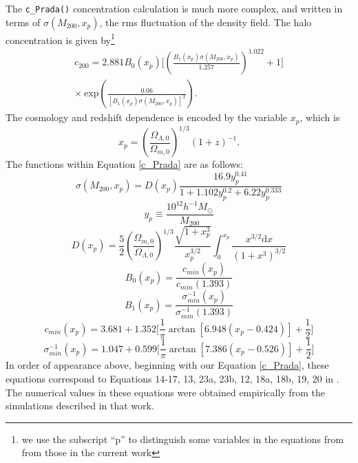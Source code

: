 \documentclass[twocolumn]{aastex6}
\newcommand{\code}{\lstinline[style=codeintext]}
\begin{document}
The \code{c_Prada()} concentration calculation is much more complex, and written in terms of $\sigma(M_{200}, x_p)$, the rms fluctuation of the density field. The \citet{Prada12} halo concentration is given by\footnote{we use the subscript ``p'' to distinguish some variables in the equations from \citet{Prada12} from those in the current work}
\begin{equation}\label{c_Prada}
\begin{split}
c_{200} = 2.881 B_0 (x_p) \bigg[ \left( \frac{B_1(x_p) \sigma(M_{200},x_p)}{1.257} \right)^{1.022} + 1 \bigg] \\
\times\ \mathrm{exp}\left( \frac{0.06}{[B_1(x_p) \sigma(M_{200},x_p) ]^2} \right).
\end{split}
\end{equation}
The cosmology and redshift dependence is encoded by the variable $x_p$, which is
\begin{equation}
x_p = \left( \frac{\Omega_{\Lambda, 0}}{\Omega_{m, 0}} \right)^{1/3} (1 + z)^{-1}.
\end{equation}
The functions within Equation \ref{c_Prada} are as follows:
\begin{equation}
\sigma(M_{200},x_p) = D(x_p) \frac{16.9 y_p^{0.41}}{1 + 1.102 y_p^{0.2} + 6.22 y_p^{0.333}}
\end{equation}
\begin{equation}
y_p \equiv \frac{10^{12} h^{-1} M_\odot}{M_{200}}
\end{equation}
\begin{equation}
D(x_p) = \frac{5}{2} \left( \frac{\Omega_{m, 0}}{\Omega_{\Lambda, 0}} \right)^{1/3} \frac{\sqrt{1 + x_p^3}}{x_p^{3/2}} \int_0^{x_p} \frac{x^{3/2} \mathrm{d}x}{(1 + x^3)^{3/2}}
\end{equation}
\begin{equation}
B_0(x_p) = \frac{c_{min}(x_p)}{c_{min}(1.393)}
\end{equation}
\begin{equation}
B_1(x_p) = \frac{\sigma^{-1}_{min}(x_p)}{\sigma^{-1}_{min}(1.393)}
\end{equation}
\begin{equation}
c_{min}(x_p) = 3.681 + 1.352 \bigg[ \frac{1}{\pi} \arctan[6.948 (x_p - 0.424)] + \frac{1}{2} \bigg]
\end{equation}
\begin{equation}
\sigma^{-1}_{min}(x_p) = 1.047 + 0.599 \bigg[ \frac{1}{\pi} \arctan[7.386 (x_p - 0.526)] + \frac{1}{2} \bigg]
\end{equation}
In order of appearance above, beginning with our Equation \ref{c_Prada}, these equations correspond to Equations 14-17, 13, 23a, 23b, 12, 18a, 18b, 19, 20 in \citet{Prada12}. The numerical values in these equations were obtained empirically from the simulations described in that work.
\end{document}
